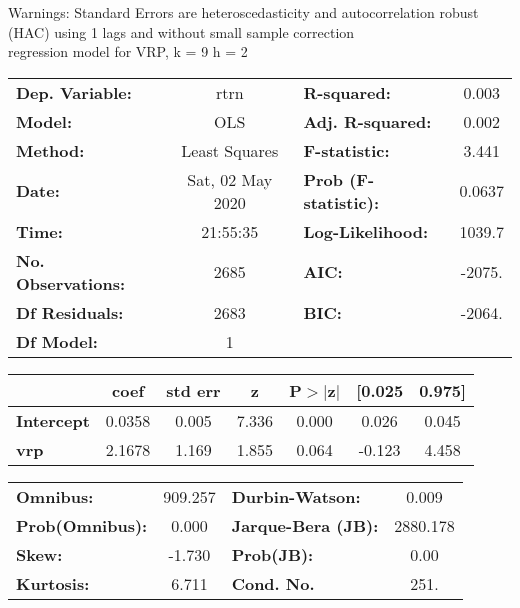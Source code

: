 Warnings: \newline
 [1] Standard Errors are heteroscedasticity and autocorrelation robust (HAC) using 1 lags and without small sample correction\\ 

regression model for VRP, k = 9 h = 2\begin{center}
\begin{tabular}{lclc}
\toprule
\textbf{Dep. Variable:}    &       rtrn       & \textbf{  R-squared:         } &     0.003   \\
\textbf{Model:}            &       OLS        & \textbf{  Adj. R-squared:    } &     0.002   \\
\textbf{Method:}           &  Least Squares   & \textbf{  F-statistic:       } &     3.441   \\
\textbf{Date:}             & Sat, 02 May 2020 & \textbf{  Prob (F-statistic):} &   0.0637    \\
\textbf{Time:}             &     21:55:35     & \textbf{  Log-Likelihood:    } &    1039.7   \\
\textbf{No. Observations:} &        2685      & \textbf{  AIC:               } &    -2075.   \\
\textbf{Df Residuals:}     &        2683      & \textbf{  BIC:               } &    -2064.   \\
\textbf{Df Model:}         &           1      & \textbf{                     } &             \\
\bottomrule
\end{tabular}
\begin{tabular}{lcccccc}
                   & \textbf{coef} & \textbf{std err} & \textbf{z} & \textbf{P$> |$z$|$} & \textbf{[0.025} & \textbf{0.975]}  \\
\midrule
\textbf{Intercept} &       0.0358  &        0.005     &     7.336  &         0.000        &        0.026    &        0.045     \\
\textbf{vrp}       &       2.1678  &        1.169     &     1.855  &         0.064        &       -0.123    &        4.458     \\
\bottomrule
\end{tabular}
\begin{tabular}{lclc}
\textbf{Omnibus:}       & 909.257 & \textbf{  Durbin-Watson:     } &    0.009  \\
\textbf{Prob(Omnibus):} &   0.000 & \textbf{  Jarque-Bera (JB):  } & 2880.178  \\
\textbf{Skew:}          &  -1.730 & \textbf{  Prob(JB):          } &     0.00  \\
\textbf{Kurtosis:}      &   6.711 & \textbf{  Cond. No.          } &     251.  \\
\bottomrule
\end{tabular}
\end{center}

